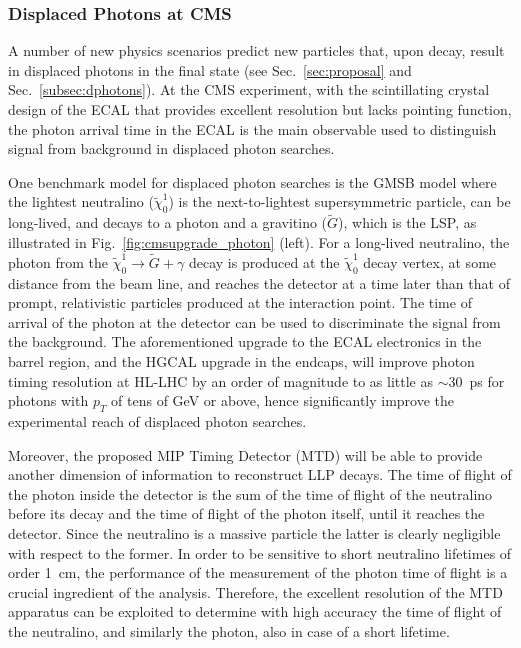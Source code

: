 \subsubsection{Displaced Photons at CMS}

A number of new physics scenarios predict new particles that, upon decay, result in displaced photons in the final state (see Sec.~\ref{sec:proposal} and Sec.~\ref{subsec:dphotons}). At the CMS experiment, with the scintillating crystal design of the ECAL that provides excellent resolution but lacks pointing function, the photon arrival time in the ECAL is the main observable used to distinguish signal from background in displaced photon searches. 

One benchmark model for displaced photon searches is the GMSB model where the lightest neutralino ($\tilde{\chi}_0^1$) is the next-to-lightest supersymmetric particle, can be long-lived, and decays to a photon and a gravitino ($\tilde{G}$), which is the LSP, as illustrated in Fig.~\ref{fig:cmsupgrade_photon} (left). For a long-lived neutralino, the photon from the $\tilde{\chi}_0^1\to\tilde{G}+\gamma$ decay is produced at the $\tilde{\chi}_0^1$ decay vertex, at some distance from the beam line, and reaches the detector at a time later than that of prompt, relativistic particles produced at the interaction point. The time of arrival of the photon at the detector can be used to discriminate the signal from the background. The aforementioned upgrade to the ECAL electronics in the barrel region, and the HGCAL upgrade in the endcaps, will improve photon timing resolution at HL-LHC by an order of magnitude to as little as $\sim30$~ps for photons with $p_T$ of tens of GeV or above, hence significantly improve the experimental reach of displaced photon searches. 

Moreover, the proposed MIP Timing Detector (MTD) will be able to provide another dimension of information to reconstruct LLP decays. The time of flight of the photon inside the detector is the sum of the time of flight of the neutralino before its decay and the time of flight of the photon itself, until it reaches the detector. Since the neutralino is a massive particle the latter is clearly negligible with respect to the former. In order to be sensitive to short neutralino lifetimes of order 1~cm, the performance of the measurement of the photon time of flight is a crucial ingredient of the analysis. Therefore, the excellent resolution of the MTD apparatus can be exploited to determine with high accuracy the time of flight of the neutralino, and similarly the photon, also in case of a short lifetime.


